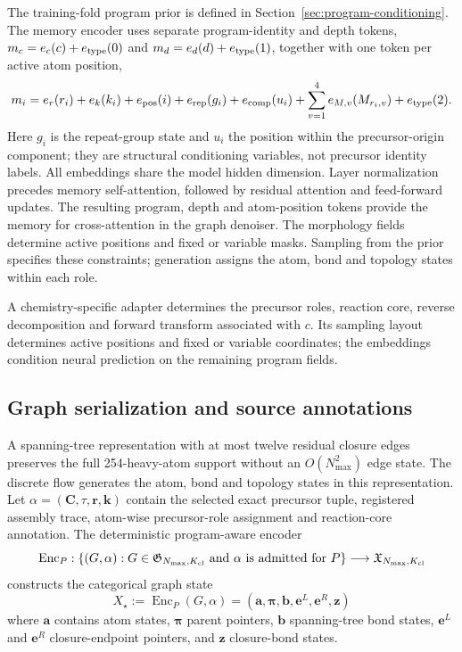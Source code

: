 The training-fold program prior is defined in Section~\ref{sec:program-conditioning}.
The memory encoder uses separate program-identity and depth tokens,
$m_c=e_c(c)+e_{\rm type}(0)$ and $m_d=e_d(d)+e_{\rm type}(1)$, together with one token per active
atom position,
\begin{equation}
 m_i=e_r(r_i)+e_k(k_i)+e_{\rm pos}(i)+e_{\rm rep}(g_i)+e_{\rm comp}(u_i)
     +\sum_{v=1}^{4}e_{M,v}(M_{r_i,v})+e_{\rm type}(2).
\end{equation}
Here $g_i$ is the repeat-group state and $u_i$ the position within the precursor-origin component;
they are structural conditioning variables, not precursor identity labels. All embeddings share the
model hidden dimension. Layer normalization precedes memory self-attention, followed by residual
attention and feed-forward updates. The resulting program, depth and atom-position tokens provide
the memory for cross-attention in the graph denoiser. The morphology fields determine active
positions and fixed or variable masks. Sampling from the prior specifies these constraints;
generation assigns the atom, bond and topology states within each role.

A chemistry-specific adapter determines the precursor roles, reaction core, reverse decomposition
and forward transform associated with $c$. Its sampling layout determines active positions and
fixed or variable coordinates; the embeddings condition neural prediction on the remaining
program fields.

\subsection{Graph serialization and source annotations}
\label{app:graph-encoding}

A spanning-tree representation with at most twelve residual closure edges preserves the full
254-heavy-atom support without an $O(N_{\max}^2)$ edge state. The discrete flow generates the atom, bond
and topology states in this representation.
Let $\alpha=(\mathbf C,\tau,\mathbf r,\mathbf k)$ contain the selected exact precursor tuple,
registered assembly trace, atom-wise precursor-role assignment and reaction-core annotation. The deterministic
program-aware encoder
\begin{equation}
    \operatorname{Enc}_P:
    \{(G,\alpha):G\in\mathfrak G_{N_{\max},K_{\rm cl}}
      \text{ and }\alpha\text{ is admitted for }P\}
    \longrightarrow \mathfrak X_{N_{\max},K_{\rm cl}}
\end{equation}
constructs the categorical graph state
\begin{equation}
    X_\star:=\operatorname{Enc}_P(G,\alpha)=
    \left(
        \mathbf{a},
        \boldsymbol{\pi},
        \mathbf{b},
        \mathbf{e}^{L},
        \mathbf{e}^{R},
        \mathbf{z}
    \right)
\end{equation}
where $\mathbf{a}$ contains atom states, $\boldsymbol{\pi}$
parent pointers, $\mathbf{b}$ spanning-tree bond states, $\mathbf{e}^{L}$ and $\mathbf{e}^{R}$
closure-endpoint pointers, and $\mathbf{z}$ closure-bond states.

